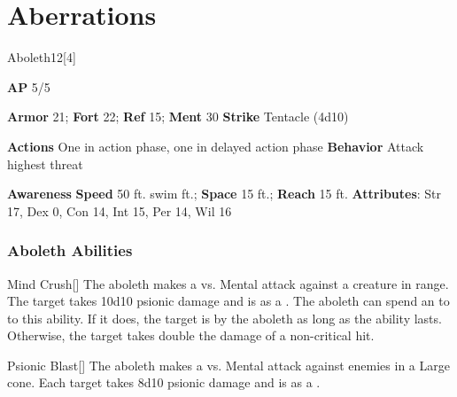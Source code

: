 
\section{Aberrations}
\begin{monsection}{Aboleth}{12}[4]
\vspace{-1em}\vspace{-1em}
\begin{spellcontent}
\begin{spelltargetinginfo}
{\textbf{AP} 5/5}

\pari \textbf{Armor} 21;
\textbf{Fort} 22;
\textbf{Ref} 15;
\textbf{Ment} 30
\pari \textbf{Strike} Tentacle  (4d10)


\pari \textbf{Actions} One in action phase, one in delayed action phase
\pari \textbf{Behavior} Attack highest threat
\end{spelltargetinginfo}
\end{spellcontent}

\begin{monsterfooter}
\pari \textbf{Awareness} 
\pari \textbf{Speed} 50 ft. swim ft.;
\textbf{Space} 15 ft.;
\textbf{Reach} 15 ft.
\pari \textbf{Attributes}:
Str 17,
Dex 0,
Con 14,
Int 15,
Per 14,
Wil 16
\end{monsterfooter}
\end{monsection}


\subsubsection{Aboleth Abilities}

\begin{freeability}{Mind Crush}[]
The aboleth makes a  vs. Mental attack against a creature in \rnglong range.
\hit The target takes 10d10 psionic damage and is  as a .
\crit The aboleth can spend an  to  to this ability.
If it does, the target is  by the aboleth as long as the ability lasts.
Otherwise, the target takes double the damage of a non-critical hit.
\end{freeability}

\vspace{0.5em}
\begin{freeability}{Psionic Blast}[]
The aboleth makes a  vs. Mental attack against enemies in a Large cone.
\hit Each target takes 8d10 psionic damage and is  as a .
\end{freeability}

